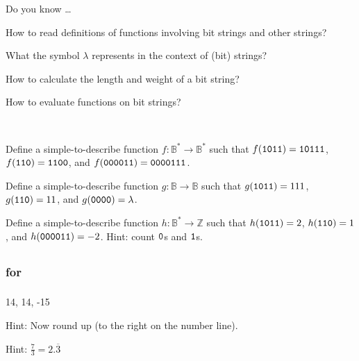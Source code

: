 \begin{exer}[\exerR] %
\label{exer_dyk_bs_fn}
    Do you know \ldots
        \begin{exerpart}
            \item How to read definitions of functions involving bit strings and other strings?
            \item What the symbol $\lambda$ represents in the context of (bit) strings?
            \item How to calculate the length and weight of a bit string?
            \item How to evaluate functions on bit strings?
        \end{exerpart}
\end{exer}

\begin{exer} [\exerE] %
\label{exer_finding_rules}
~
    \begin{exerpart}
        \item Define a simple-to-describe function $f:\mathbb{B}^*\to \mathbb{B}^*$ such that $f(\texttt{1011}) = \texttt{10111}$, $f(\texttt{110})= \texttt{1100}$, and $f(\texttt{000011}) = \texttt{0000111}$. %

        \item Define a simple-to-describe function $g:\mathbb{B}\to \mathbb{B}$ such that $g(\texttt{1011}) = 111$, $g(\texttt{110})= 11$, and $g(\texttt{0000}) = \lambda$.  %
        
        \item Define a simple-to-describe function $h:\mathbb{B}^*\to \mathbb{Z}$ such that $h(\texttt{1011}) = 2$, $h(\texttt{110})= 1$, and $h(\texttt{000011}) = -2$. Hint: count $\texttt{0}$s and $\texttt{1}$s. %
    \end{exerpart}
\end{exer}

\subsection{\answers}

\subsubsection{\answers for  \subfloorceiling}

\subsubsection*{ \answers}
\begin{apart}
    \item 14, 14, -15
    \item Hint: Now round up (to the right on the number line).
    \item Hint: $\frac{7}{3} = 2.\overline{3}$
\end{apart}

